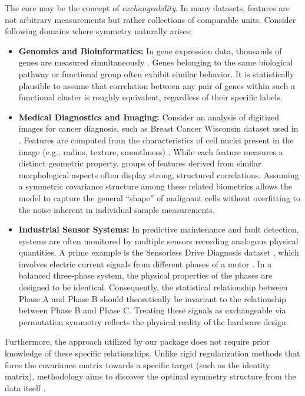 The core may be the concept of \emph{exchangeability}. In many datasets, features are not arbitrary measurements but rather collections of comparable units. Consider following domains where symmetry naturally arises:

\begin{itemize}
\tightlist
\item
  \textbf{Genomics and Bioinformatics:} In gene expression data, thousands of genes are measured simultaneously \citep{dudoit2002comparison}. Genes belonging to the same biological pathway or functional group often exhibit similar behavior. It is statistically plausible to assume that correlation between any pair of genes within such a functional cluster is roughly equivalent, regardless of their specific labels.
\item
  \textbf{Medical Diagnostics and Imaging:} Consider an analysis of digitized images for cancer diagnosis, such as Breast Cancer Wisconsin dataset used in \citep{breast}. Features are computed from the characteristics of cell nuclei present in the image (e.g., radius, texture, smoothness) \citep{street1993nuclear}. While each feature measures a distinct geometric property, groups of features derived from similar morphological aspects often display strong, structured correlations. Assuming a symmetric covariance structure among these related biometrics allows the model to capture the general ``shape'' of malignant cells without overfitting to the noise inherent in individual sample measurements.
\item
  \textbf{Industrial Sensor Systems:} In predictive maintenance and fault detection, systems are often monitored by multiple sensors recording analogous physical quantities. A prime example is the Sensorless Drive Diagnosis dataset \citep{dataset_for_sensorless_drive_diagnosis_325}, which involves electric current signals from different phases of a motor \citep{seera2014classification}. In a balanced three-phase system, the physical properties of the phases are designed to be identical. Consequently, the statistical relationship between Phase A and Phase B should theoretically be invariant to the relationship between Phase B and Phase C. Treating these signals as exchangeable via permutation symmetry reflects the physical reality of the hardware design.
\end{itemize}

Furthermore, the  approach utilized by our package does not require prior knowledge of these specific relationships. Unlike rigid regularization methods that force the covariance matrix towards a specific target (such as the identity matrix),  methodology aims to discover the optimal symmetry structure from the data itself \citep{JSSv112i07}.

